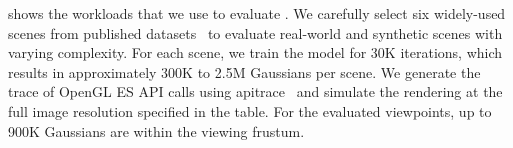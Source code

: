 
\begin{table}[t]
  \caption{Evaluated workloads.}
  \label{tab:workloads}
\end{table}


%
 shows the workloads that we use to evaluate \name{}.
%
We carefully select six widely-used scenes from published
datasets~\cite{bar:mil22,kna:par17,mil:sri20} to evaluate real-world and
synthetic scenes with varying complexity.
%
For each scene, we train the model for 30K iterations, which results in
approximately {300K to 2.5M} Gaussians per scene.
%
We generate the trace of OpenGL ES API calls using apitrace~\cite{apitrace} and
simulate the rendering at the full image resolution specified in the table.
%
For the evaluated viewpoints, up to 900K Gaussians are within the viewing
frustum.
